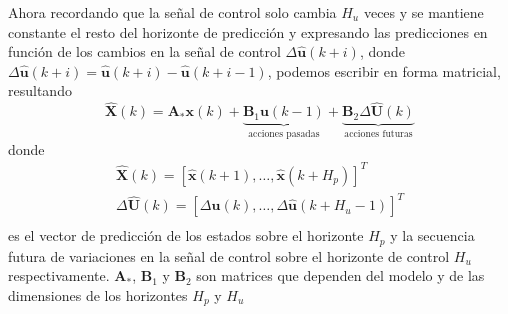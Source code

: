 Ahora recordando que la se{\~n}al de control solo cambia $H_u$ veces y se mantiene constante el resto del
horizonte de predicci{\'o}n y expresando las predicciones en funci{\'o}n de los cambios en la se{\~n}al de control
$\Delta\mathbf{\hat{u}}(k+i)$, donde
$\Delta\mathbf{\hat{u}}(k+i)=\mathbf{\hat{u}}(k+i)-\mathbf{\hat{u}}(k+i-1)$, podemos escribir en forma
matricial, resultando
\begin{equation}
\mathbf{\hat{X}}(k)=\mathbf{A}_{*}\mathbf{x}(k)+\underbrace{\mathbf{B}_{1}\mathbf{u}(k-1)}_{\text{acciones
pasadas}}+\underbrace{\mathbf{B}_{2}\Delta\mathbf{\hat{U}}(k)}_{\text{acciones futuras}}
\end{equation}
donde
\begin{equation}
 \begin{array}{l}
\mathbf{\hat{X}}(k)=\left[\mathbf{\hat{x}}(k+1),\ldots,\mathbf{\hat{x}}(k+H_p)\right]^T\\
\Delta\mathbf{\hat{U}}(k)=\left[\Delta\mathbf{\hat{u}}(k),\ldots,\Delta\mathbf{\hat{u}}(k+H_u-1)\right]^T\\
 \end{array}
\end{equation}
es el vector de predicci{\'o}n de los estados sobre el horizonte $H_p$ y la secuencia futura de variaciones en
la se{\~n}al de control sobre el horizonte de control $H_u$ respectivamente. $\mathbf{A}_*$, $\mathbf{B}_1$ y
$\mathbf{B}_2$ son matrices que dependen del modelo y de las dimensiones de los horizontes $H_p$ y $H_u$
